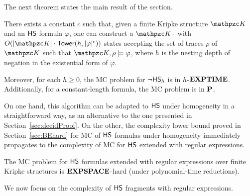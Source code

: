 The next theorem states the main result of the section.
%
  \begin{theorem}\label{th-m} There exists a constant $c$ such that, given a finite Kripke structure $\Ku$ and  an $\text{\sffamily HS}$ formula $\varphi$, one can construct %
  a $\Ku$-\NFA\ with $O(|\Ku| \cdot \Tower(h,|\varphi|^{c}))$ states  accepting the set of traces $\rho$ of $\Ku$
  such that $\Ku,\rho\models  \varphi$, where $h$ is the nesting depth of negation in the existential form of $\varphi$. 
  
  Moreover,  for each $h\geq 0$, the MC problem for $\neg\text{\sffamily HS}_h$
is in \mbox{$h$-$\textbf{EXPTIME}$}. Additionally, for a constant-length formula,
the MC problem is in $\textbf{P}$.
  \end{theorem} 
  
On one hand, this algorithm can be adapted to $\text{\sffamily HS}$ under homogeneity in a straightforward way, as an alternative to the one presented in 
Section~\ref{sec:decidProof}. On the other, the complexity lower bound proved in Section~\ref{sec:BEhard} for MC of $\text{\sffamily HS}$ formulas under  homogeneity immediately propagates to the complexity of MC for $\text{\sffamily HS}$ extended with regular expressions.

\begin{theorem}\label{theorem:lowerBoundBERegex} The MC problem for $\text{\sffamily HS}$ formulas extended with regular expressions over finite Kripke structures is $\textbf{EXPSPACE}$-hard (under polynomial-time reductions).
\end{theorem}
  
We now focus on the complexity of $\text{\sffamily HS}$ fragments with regular expressions.
